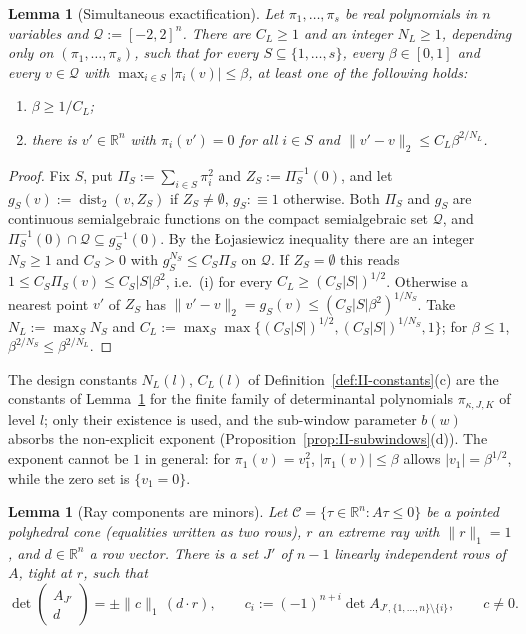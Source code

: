 \documentclass[10pt]{amsart}
\newtheorem{lemma}[theorem]{Lemma}
\theoremstyle{definition}
\theoremstyle{remark}
\newcommand{\dist}{\operatorname{dist}}
\newcommand{\R}{\mathbb R}
\begin{document}
\begin{lemma}[Simultaneous exactification]\label{lem:II-loj}
Let $\pi_1,\dots,\pi_s$ be real polynomials in $n$ variables and
$\mathcal Q:=[-2,2]^n$.  There are $C_L\ge1$ and an integer $N_L\ge1$,
depending only on $(\pi_1,\dots,\pi_s)$, such that for every
$S\subseteq\{1,\dots,s\}$, every $\beta\in[0,1]$ and every $v\in\mathcal Q$
with $\max_{i\in S}|\pi_i(v)|\le\beta$, at least one of the following holds:
\begin{enumerate}
\item[(i)] $\beta\ge1/C_L$;
\item[(ii)] there is $v'\in\R^n$ with $\pi_i(v')=0$ for all $i\in S$ and
$\|v'-v\|_2\le C_L\beta^{2/N_L}$.
\end{enumerate}
\end{lemma}

\begin{proof}
Fix $S$, put $\Pi_S:=\sum_{i\in S}\pi_i^2$ and $Z_S:=\Pi_S^{-1}(0)$, and let
$g_S(v):=\dist_2(v,Z_S)$ if $Z_S\ne\emptyset$, $g_S:\equiv1$ otherwise.  Both
$\Pi_S$ and $g_S$ are continuous semialgebraic functions on the compact
semialgebraic set $\mathcal Q$, and $\Pi_S^{-1}(0)\cap\mathcal Q\subseteq
g_S^{-1}(0)$.  By the {\L}ojasiewicz inequality \cite[Corollary~2.6.7]{BCR} there are an integer
$N_S\ge1$ and $C_S>0$ with $g_S^{N_S}\le C_S\Pi_S$ on $\mathcal Q$.  If
$Z_S=\emptyset$ this reads $1\le C_S\Pi_S(v)\le C_S|S|\beta^2$, i.e.\ (i) for
every $C_L\ge(C_S|S|)^{1/2}$.  Otherwise a nearest point $v'$ of $Z_S$ has
$\|v'-v\|_2=g_S(v)\le(C_S|S|\beta^2)^{1/N_S}$.  Take $N_L:=\max_SN_S$ and
$C_L:=\max_S\max\{(C_S|S|)^{1/2},(C_S|S|)^{1/N_S},1\}$; for $\beta\le1$,
$\beta^{2/N_S}\le\beta^{2/N_L}$.
\end{proof}

The design constants $N_L(l)$, $C_L(l)$ of
Definition~\ref{def:II-constants}(c) are the constants of
Lemma~\ref{lem:II-loj} for the finite family of determinantal polynomials
$\pi_{\kappa,J,K}$ of level $l$; only their existence is used, and the
sub-window parameter $b(w)$ absorbs the non-explicit exponent
(Proposition~\ref{prop:II-subwindows}(d)).  The exponent cannot be $1$ in
general: for $\pi_1(v)=v_1^2$, $|\pi_1(v)|\le\beta$ allows $|v_1|=\beta^{1/2}$,
while the zero set is $\{v_1=0\}$.

\begin{lemma}[Ray components are minors]\label{lem:II-raycomp}
Let $\mathcal C=\{\tau\in\R^n:A\tau\le0\}$ be a pointed polyhedral cone
\textup{(}equalities written as two rows\textup{)}, $r$ an extreme ray with
$\|r\|_1=1$, and $d\in\R^n$ a row vector.  There is a set $J'$ of $n-1$
linearly independent rows of $A$, tight at $r$, such that
\[
 \det\begin{pmatrix}A_{J'}\\ d\end{pmatrix}=\pm\|c\|_1\,(d\cdot r),\qquad
 c_i:=(-1)^{n+i}\det A_{J',\{1,\dots,n\}\setminus\{i\}},\qquad c\ne0 .
\]
\end{lemma}
\end{document}
